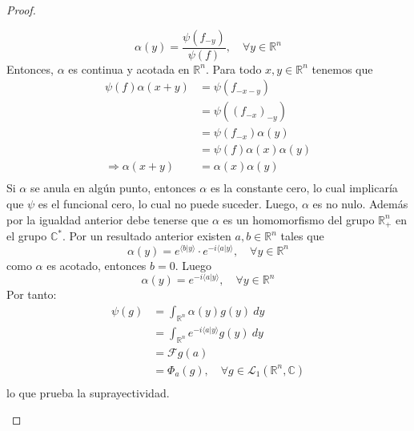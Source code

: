 \documentclass[12pt]{report}
\newcounter{it}
\theoremstyle{largebreak}
\newcommand\pint[2]{\ensuremath{\langle#1| #2\rangle}}
\newcommand{\fou}[1]{\ensuremath{\mathcal{F}#1}}
\begin{document}
\begin{proof}
\begin{enumerate}
\begin{equation*}
                \alpha(y)=\frac{\psi(f_{ -y})}{\psi(f)},\quad\forall y\in\mathbb{R}^n
            \end{equation*}
            Entonces, $\alpha$ es continua y acotada en $\mathbb{R}^n$. Para todo $x,y\in\mathbb{R}^n$ tenemos que
            \begin{equation*}
                \begin{split}
                    \psi(f)\alpha(x+y)&=\psi(f_{-x-y})\\
                    &=\psi((f_{-x})_{ -y})\\
                    &=\psi(f_{-x})\alpha(y)\\
                    &=\psi(f)\alpha(x)\alpha(y)\\
                    \Rightarrow \alpha(x+y)&=\alpha(x)\alpha(y)\\
                \end{split}
            \end{equation*}
            Si $\alpha$ se anula en algún punto, entonces $\alpha$ es la constante cero, lo cual implicaría que $\psi$ es el funcional cero, lo cual no puede suceder. Luego, $\alpha$ es no nulo. Además por la igualdad anterior debe tenerse que $\alpha$ es un homomorfismo del grupo $\mathbb{R}^n_+$ en el grupo $\mathbb{C}^*$. Por un resultado anterior existen $a,b\in\mathbb{R}^n$ tales que
            \begin{equation*}
                \alpha(y)=e^{\pint{b}{y}}\cdot e^{-i\pint{a}{y}},\quad\forall y\in\mathbb{R}^n
            \end{equation*}
            como $\alpha$ es acotado, entonces $b=0$. Luego
            \begin{equation*}
                \alpha(y)=e^{-i\pint{a}{y}},\quad\forall y\in\mathbb{R}^n
            \end{equation*}
            Por tanto:
            \begin{equation*}
                \begin{split}
                    \psi(g)&=\int_{\mathbb{R}^n}\alpha(y)g(y)\:dy\\
                    &=\int_{\mathbb{R}^n}e^{ -i\pint{a}{y}}g(y)\:dy\\
                    &=\fou{g}(a)\\
                    &=\Phi_a(g),\quad\forall g\in\mathcal{L}_1(\mathbb{R}^n,\mathbb{C})\\
                \end{split}
            \end{equation*}
            lo que prueba la suprayectividad.
        \end{enumerate}
    \end{proof}
\end{document}
